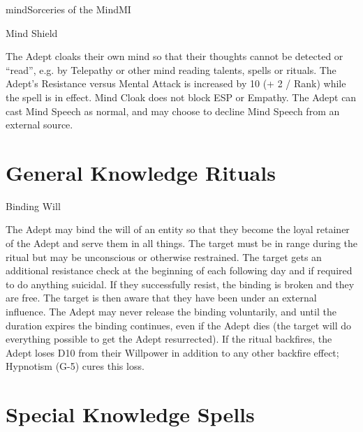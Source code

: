\begin{College}[1.6]{mind}{Sorceries of the Mind}{MI}
\begin{spell}[G-7]{Mind Shield}

\begin{effects}
The Adept cloaks their own mind so that their thoughts cannot be
detected or “read”, e.g. by Telepathy or other mind reading talents,
spells or rituals.  The Adept’s Resistance versus Mental Attack is
increased by 10 (+ 2 / Rank) while the spell is in effect.  Mind Cloak
does not block ESP or Empathy.  The Adept can cast Mind Speech as
normal, and may choose to decline Mind Speech from an external source.
\end{effects}
\end{spell}

\section{General Knowledge Rituals}

\begin{ritual}[Q-1]{Binding Will}

\begin{effects}
The Adept may bind the will of an entity so that they become the loyal
retainer of the Adept and serve them in all things. The target must be
in range during the ritual but may be unconscious or otherwise
restrained.  The target gets an additional resistance check at the
beginning of each following day and if required to do anything
suicidal. If they successfully resist, the binding is broken and they
are free.  The target is then aware that they have been under an
external influence.  The Adept may never release the binding
voluntarily, and until the duration expires the binding continues,
even if the Adept dies (the target will do everything possible to get
the Adept resurrected). If the ritual backfires, the Adept loses D10
from their Willpower in addition to any other backfire effect;
Hypnotism (G-5) cures this loss.
\end{effects}
\end{ritual}

\section{Special Knowledge Spells}


\end{College}
